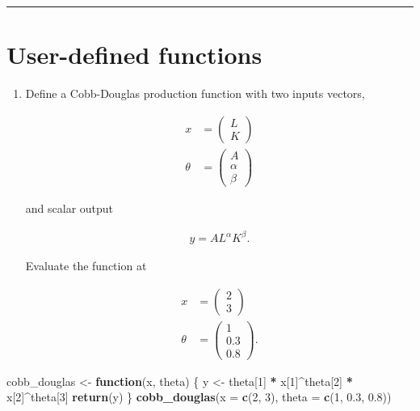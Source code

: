 \documentclass[]{article}
\newenvironment{Shaded}{\begin{snugshade}}{\end{snugshade}}
\newcommand{\KeywordTok}[1]{\textcolor[rgb]{0.13,0.29,0.53}{\textbf{#1}}}
\newcommand{\DataTypeTok}[1]{\textcolor[rgb]{0.13,0.29,0.53}{#1}}
\newcommand{\DecValTok}[1]{\textcolor[rgb]{0.00,0.00,0.81}{#1}}
\newcommand{\FloatTok}[1]{\textcolor[rgb]{0.00,0.00,0.81}{#1}}
\newcommand{\StringTok}[1]{\textcolor[rgb]{0.31,0.60,0.02}{#1}}
\newcommand{\ControlFlowTok}[1]{\textcolor[rgb]{0.13,0.29,0.53}{\textbf{#1}}}
\newcommand{\OperatorTok}[1]{\textcolor[rgb]{0.81,0.36,0.00}{\textbf{#1}}}
\newcommand{\NormalTok}[1]{#1}
\providecommand{\tightlist}{%
  \setlength{\itemsep}{0pt}\setlength{\parskip}{0pt}}
\begin{document}
\begin{center}\rule{0.5\linewidth}{\linethickness}\end{center}

\section{User-defined functions}\label{user-defined-functions}

\begin{enumerate}
\def\labelenumi{\arabic{enumi}.}
\tightlist
\item
  Define a Cobb-Douglas production function with two inputs vectors,

  \begin{align*}
  x &=\left( 
  \begin{array}{c}
  L \\ 
  K
  \end{array}
  \right) \\
  \theta &=\left( 
  \begin{array}{c}
  A \\ 
  \alpha \\ 
  \beta
  \end{array}
  \right)
  \end{align*}

  and scalar output

  \begin{align*}
  y=AL^{\alpha }K^{\beta }.
  \end{align*}

  Evaluate the function at

  \begin{align*}
  x &=\left( 
  \begin{array}{c}
  2 \\ 
  3
  \end{array}
  \right) \\
  \theta &=\left( 
  \begin{array}{c}
  1 \\ 
  0.3 \\ 
  0.8
  \end{array}
  \right) .
  \end{align*}
\end{enumerate}

\begin{Shaded}
\begin{Highlighting}[]
\NormalTok{cobb_douglas <-}\StringTok{ }\ControlFlowTok{function}\NormalTok{(x, theta) \{}
\NormalTok{  y <-}\StringTok{ }\NormalTok{theta[}\DecValTok{1}\NormalTok{] }\OperatorTok{*}\StringTok{ }\NormalTok{x[}\DecValTok{1}\NormalTok{]}\OperatorTok{^}\NormalTok{theta[}\DecValTok{2}\NormalTok{] }\OperatorTok{*}\StringTok{ }\NormalTok{x[}\DecValTok{2}\NormalTok{]}\OperatorTok{^}\NormalTok{theta[}\DecValTok{3}\NormalTok{]  }
  \KeywordTok{return}\NormalTok{(y)}
\NormalTok{\}}
\KeywordTok{cobb_douglas}\NormalTok{(}\DataTypeTok{x =} \KeywordTok{c}\NormalTok{(}\DecValTok{2}\NormalTok{, }\DecValTok{3}\NormalTok{), }\DataTypeTok{theta =} \KeywordTok{c}\NormalTok{(}\DecValTok{1}\NormalTok{, }\FloatTok{0.3}\NormalTok{, }\FloatTok{0.8}\NormalTok{))  }
\end{Highlighting}
\end{Shaded}
\end{document}
